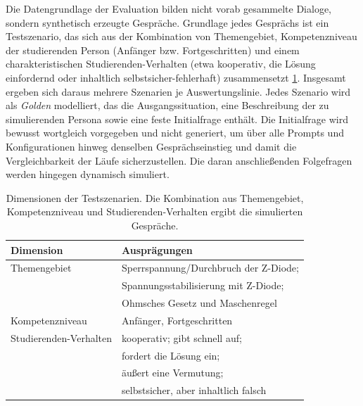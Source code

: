Die Datengrundlage der Evaluation bilden nicht vorab gesammelte Dialoge, sondern
synthetisch erzeugte Gespräche. Grundlage jedes Gesprächs ist ein Testszenario,
das sich aus der Kombination von Themengebiet, Kompetenzniveau der studierenden Person
(Anfänger bzw. Fortgeschritten) und einem charakteristischen Studierenden-Verhalten
(etwa kooperativ, die Lösung einfordernd oder inhaltlich selbstsicher-fehlerhaft)
zusammensetzt \ref{tab:szenario-dimensionen}. Insgesamt ergeben sich daraus mehrere Szenarien je Auswertungslinie. Jedes Szenario wird als \emph{Golden} modelliert, das die
Ausgangssituation, eine Beschreibung der zu simulierenden Persona sowie eine feste
Initialfrage enthält. Die Initialfrage wird bewusst wortgleich vorgegeben und nicht
generiert, um über alle Prompts und Konfigurationen hinweg denselben Gesprächseinstieg
und damit die Vergleichbarkeit der Läufe sicherzustellen. Die daran anschließenden
Folgefragen werden hingegen dynamisch simuliert.

\begin{table}[htbp]
  \centering
  \caption{Dimensionen der Testszenarien. Die Kombination aus Themengebiet,
  Kompetenzniveau und Studierenden-Verhalten ergibt die simulierten Gespr\"ache.}
  \label{tab:szenario-dimensionen}
  \begin{tabular}{ll}
    \toprule
    \textbf{Dimension} & \textbf{Auspr\"agungen} \\
    \midrule
    Themengebiet & Sperrspannung/Durchbruch der Z-Diode; \\
                 & Spannungsstabilisierung mit Z-Diode; \\
                 & Ohmsches Gesetz und Maschenregel \\
    \addlinespace
    Kompetenzniveau & Anf\"anger, Fortgeschritten \\
    \addlinespace
    Studierenden-Verhalten & kooperativ; gibt schnell auf; \\
                           & fordert die L\"osung ein; \\
                           & \"au{\ss}ert eine Vermutung; \\
                           & selbstsicher, aber inhaltlich falsch \\
    \bottomrule
  \end{tabular}
\end{table}
 
